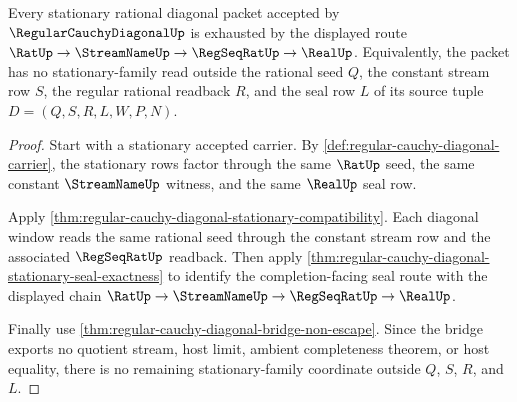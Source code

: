 \begin{theorem}
\label{thm:regular-cauchy-diagonal-stationary-family-exhaustion}
Every stationary rational diagonal packet accepted by $\RegularCauchyDiagonalUp$ is exhausted by the displayed route $\RatUp \to \StreamNameUp \to \RegSeqRatUp \to \RealUp$. Equivalently, the packet has no stationary-family read outside the rational seed $Q$, the constant stream row $S$, the regular rational readback $R$, and the seal row $L$ of its source tuple $D=(Q,S,R,L,W,P,N)$.
\end{theorem}
\begin{proof}
Start with a stationary accepted carrier. By \autoref{def:regular-cauchy-diagonal-carrier}, the stationary rows factor through the same $\RatUp$ seed, the same constant $\StreamNameUp$ witness, and the same $\RealUp$ seal row.

Apply \autoref{thm:regular-cauchy-diagonal-stationary-compatibility}. Each diagonal window reads the same rational seed through the constant stream row and the associated $\RegSeqRatUp$ readback. Then apply \autoref{thm:regular-cauchy-diagonal-stationary-seal-exactness} to identify the completion-facing seal route with the displayed chain $\RatUp \to \StreamNameUp \to \RegSeqRatUp \to \RealUp$.

Finally use \autoref{thm:regular-cauchy-diagonal-bridge-non-escape}. Since the bridge exports no quotient stream, host limit, ambient completeness theorem, or host equality, there is no remaining stationary-family coordinate outside $Q$, $S$, $R$, and $L$.
\end{proof}

